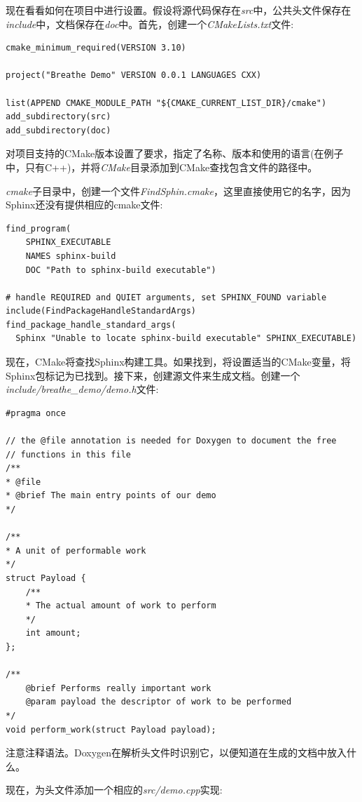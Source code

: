 现在看看如何在项目中进行设置。假设将源代码保存在\textit{src}中，公共头文件保存在\textit{include}中，文档保存在\textit{doc}中。首先，创建一个\textit{CMakeLists.txt}文件:

\begin{lstlisting}[style=styleCMake]
cmake_minimum_required(VERSION 3.10)

project("Breathe Demo" VERSION 0.0.1 LANGUAGES CXX)

list(APPEND CMAKE_MODULE_PATH "${CMAKE_CURRENT_LIST_DIR}/cmake")
add_subdirectory(src)
add_subdirectory(doc)
\end{lstlisting}

对项目支持的CMake版本设置了要求，指定了名称、版本和使用的语言(在例子中，只有C++)，并将\textit{CMake}目录添加到CMake查找包含文件的路径中。

\textit{cmake}子目录中，创建一个文件\textit{FindSphin.cmake}，这里直接使用它的名字，因为Sphinx还没有提供相应的cmake文件:

\begin{lstlisting}[style=styleCMake]
find_program(
	SPHINX_EXECUTABLE
	NAMES sphinx-build
	DOC "Path to sphinx-build executable")

# handle REQUIRED and QUIET arguments, set SPHINX_FOUND variable
include(FindPackageHandleStandardArgs)
find_package_handle_standard_args(
  Sphinx "Unable to locate sphinx-build executable" SPHINX_EXECUTABLE)
\end{lstlisting}

现在，CMake将查找Sphinx构建工具。如果找到，将设置适当的CMake变量，将Sphinx包标记为已找到。接下来，创建源文件来生成文档。创建一个\textit{include/breathe\_demo/demo.h}文件:

\begin{lstlisting}[style=styleCXX]
#pragma once

// the @file annotation is needed for Doxygen to document the free
// functions in this file
/**
* @file
* @brief The main entry points of our demo
*/

/**
* A unit of performable work
*/
struct Payload {
	/**
	* The actual amount of work to perform
	*/
	int amount;
};

/**
	@brief Performs really important work
	@param payload the descriptor of work to be performed
*/
void perform_work(struct Payload payload);
\end{lstlisting}

注意注释语法。Doxygen在解析头文件时识别它，以便知道在生成的文档中放入什么。

现在，为头文件添加一个相应的\textit{src/demo.cpp}实现:

